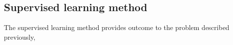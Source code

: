 \subsection{Supervised learning method}
The supervised learning method provides outcome to the problem described previously,
